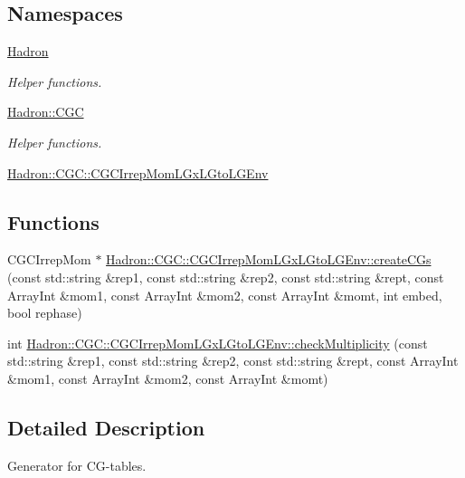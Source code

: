 \subsection*{Namespaces}
\begin{DoxyCompactItemize}
\item 
 \mbox{\hyperlink{namespaceHadron}{Hadron}}
\begin{DoxyCompactList}\small\item\em Helper functions. \end{DoxyCompactList}\item 
 \mbox{\hyperlink{namespaceHadron_1_1CGC}{Hadron\+::\+C\+GC}}
\begin{DoxyCompactList}\small\item\em Helper functions. \end{DoxyCompactList}\item 
 \mbox{\hyperlink{namespaceHadron_1_1CGC_1_1CGCIrrepMomLGxLGtoLGEnv}{Hadron\+::\+C\+G\+C\+::\+C\+G\+C\+Irrep\+Mom\+L\+Gx\+L\+Gto\+L\+G\+Env}}
\end{DoxyCompactItemize}
\subsection*{Functions}
\begin{DoxyCompactItemize}
\item 
C\+G\+C\+Irrep\+Mom $\ast$ \mbox{\hyperlink{namespaceHadron_1_1CGC_1_1CGCIrrepMomLGxLGtoLGEnv_aac28a74a71012455c31bc9ba558b35da}{Hadron\+::\+C\+G\+C\+::\+C\+G\+C\+Irrep\+Mom\+L\+Gx\+L\+Gto\+L\+G\+Env\+::create\+C\+Gs}} (const std\+::string \&rep1, const std\+::string \&rep2, const std\+::string \&rept, const Array\+Int \&mom1, const Array\+Int \&mom2, const Array\+Int \&momt, int embed, bool rephase)
\item 
int \mbox{\hyperlink{namespaceHadron_1_1CGC_1_1CGCIrrepMomLGxLGtoLGEnv_ac903fc6025ce80a33975cbd2b635e7df}{Hadron\+::\+C\+G\+C\+::\+C\+G\+C\+Irrep\+Mom\+L\+Gx\+L\+Gto\+L\+G\+Env\+::check\+Multiplicity}} (const std\+::string \&rep1, const std\+::string \&rep2, const std\+::string \&rept, const Array\+Int \&mom1, const Array\+Int \&mom2, const Array\+Int \&momt)
\end{DoxyCompactItemize}


\subsection{Detailed Description}
Generator for C\+G-\/tables. 

